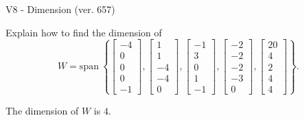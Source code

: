 \begin{exercise}
  \begin{exerciseTitle}V8 - Dimension (ver. 657)\end{exerciseTitle}
  \begin{exerciseStatement}
    Explain how to find the dimension of 
\[W=\mathrm{span}\ \left\{\left[\begin{array}{r}
-4 \\
0 \\
0 \\
0 \\
-1
\end{array}\right] , \left[\begin{array}{r}
1 \\
1 \\
-4 \\
-4 \\
0
\end{array}\right] , \left[\begin{array}{r}
-1 \\
3 \\
0 \\
1 \\
-1
\end{array}\right] , \left[\begin{array}{r}
-2 \\
-2 \\
-2 \\
-3 \\
0
\end{array}\right] , \left[\begin{array}{r}
20 \\
4 \\
2 \\
4 \\
4
\end{array}\right]\right\}.\]



  \end{exerciseStatement}
  \begin{exerciseAnswer}
   The dimension of \(W\) is  \(4\).
  


  \end{exerciseAnswer}
\end{exercise}